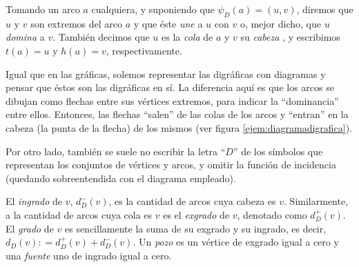  Tomando un arco $a$ cualquiera, y suponiendo que $\psi_D (a) = (u,v)$, diremos que $u$ y $v$ son extremos del arco $a$ y que éste \textit{une} a $u$ con $v$ o, mejor dicho, que $u$ \textit{domina} a $v$. También decimos que $u$ es la \textit{cola}  de $a$ y $v$ su \textit{cabeza} , y escribimos $t(a) = u$ y $h(a)=v$, respectivamente.
 
 Igual que en las gráficas, solemos representar las digráficas con diagramas  y pensar que éstos son las digráficas en sí. La diferencia aquí es que los arcos se dibujan como flechas entre sus vértices extremos, para indicar la ``dominancia'' entre ellos. Entonces, las flechas ``salen'' de las colas de los arcos y ``entran'' en la cabeza (la punta de la flecha) de los mismos (ver figura \ref{ejem:diagramadigrafica}).
 
 Por otro lado, también se suele no escribir la letra ``$D$'' de los símbolos que representan los conjuntos de vértices y arcos, y omitir la función de incidencia (quedando sobreentendida con el diagrama empleado).
 
 El \textit{ingrado} de $v$, $d_{D}^{-}(v)$, es la cantidad de arcos cuya cabeza es $v$. Similarmente, a la cantidad de arcos cuya cola es $v$ es el \textit{exgrado} de $v$, denotado como $d_{D}^{+}(v)$. El \textit{grado} de $v$ es sencillamente la suma de su exgrado y su ingrado, es decir, $d_{D}(v) : = d_{D}^{+}(v) + d_{D}^{-}(v)$. Un \textit{pozo} es un vértice de exgrado igual a cero y una \textit{fuente} uno de ingrado igual a cero.
 
